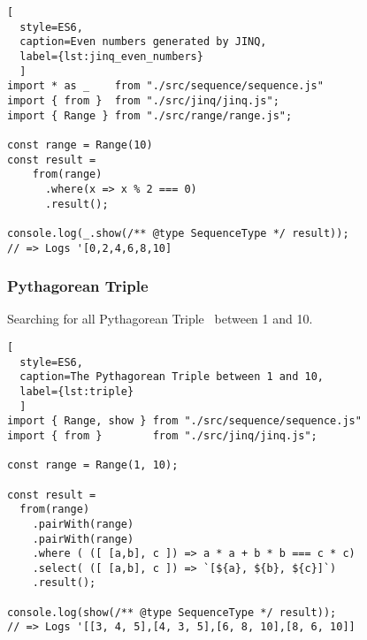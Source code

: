 \begin{lstlisting}[
  style=ES6, 
  caption=Even numbers generated by JINQ,
  label={lst:jinq_even_numbers}
  ]
import * as _    from "./src/sequence/sequence.js"
import { from }  from "./src/jinq/jinq.js";
import { Range } from "./src/range/range.js";

const range = Range(10)
const result =
    from(range)
      .where(x => x % 2 === 0)
      .result();

console.log(_.show(/** @type SequenceType */ result));
// => Logs '[0,2,4,6,8,10]
\end{lstlisting}

\subsubsection{Pythagorean Triple}
\label{subsub:JINQ_Pythagorean Triple}
Searching for all Pythagorean Triple~\cite{pythagorean_triple} between 1 and 10.

\begin{lstlisting}[
  style=ES6, 
  caption=The Pythagorean Triple between 1 and 10,
  label={lst:triple}
  ]
import { Range, show } from "./src/sequence/sequence.js"
import { from }        from "./src/jinq/jinq.js";

const range = Range(1, 10);

const result =
  from(range)
    .pairWith(range)
    .pairWith(range)
    .where ( ([ [a,b], c ]) => a * a + b * b === c * c)
    .select( ([ [a,b], c ]) => `[${a}, ${b}, ${c}]`)
    .result();

console.log(show(/** @type SequenceType */ result));
// => Logs '[[3, 4, 5],[4, 3, 5],[6, 8, 10],[8, 6, 10]]
\end{lstlisting}
